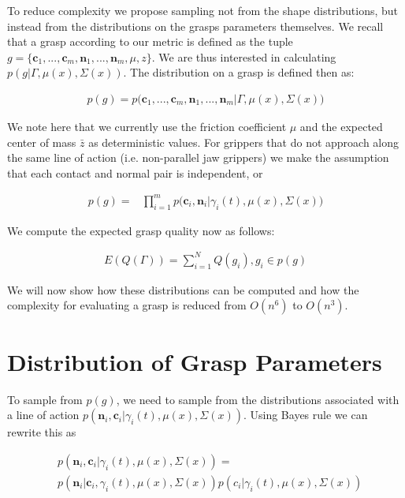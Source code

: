 \documentclass[letterpaper, 10 pt, conference]{ieeeconf}  %
\begin{document}
To reduce complexity we propose sampling not from the shape distributions, but instead from the distributions on the grasps parameters themselves. We recall that a grasp according to our metric is defined as the tuple $g = \lbrace \textbf{c}_1,...,\textbf{c}_m,\textbf{n}_1,...,\textbf{n}_m,\mu, z \rbrace$. We are thus interested in calculating $p(g|\Gamma,\mu(x),\Sigma(x))$. The distribution on a grasp is defined then as: 

\begin{align}\label{eq:joint_on_shape}
p(g) = p\big(\textbf{c}_1,...,\textbf{c}_m,\textbf{n}_1,...,\textbf{n}_m|\Gamma,\mu(x),\Sigma(x)\big)
\end{align}

We note here that we currently use the friction coefficient $\mu$ and the expected center of mass $\bar{z}$ as deterministic values. For grippers that do not approach along the same line of action (i.e. non-parallel jaw grippers) we make the assumption that each contact and normal pair is independent, or 

\vspace{-2ex}
\begin{align}\label{eq:independence}
p(g) = &\prod_{i=1}^mp\big(\textbf{c}_i,\textbf{n}_i|\gamma_i(t),\mu(x),\Sigma(x)\big)
\end{align}



We compute the expected grasp quality now as follows: 

\vspace{-2ex}
\begin{align}\label{eq:grasp_sampling}
E(Q(\Gamma)) = \sum_{i=1}^N Q(g_i) , g_i \in p(g)
\end{align}


We will now show how these distributions can be computed and how the complexity for evaluating a grasp is reduced from $O(n^6)$ to $O(n^3)$. 


\section{Distribution of Grasp Parameters}
\label{sec:distgrasp}
 
 To sample from $p(g)$, we need to sample from the distributions associated with a line of action $p(\textbf{n}_i,\textbf{c}_i|\gamma_i(t),\mu(x),\Sigma(x))$. Using Bayes rule we can rewrite this as 
 
 \vspace{-2ex}
 \begin{align*}
 &p(\textbf{n}_i,\textbf{c}_i|\gamma_i(t),\mu(x),\Sigma(x))=\\
 &p(\textbf{n}_i|\textbf{c}_i,\gamma_i(t),\mu(x),\Sigma(x))p(c_i|\gamma_i(t),\mu(x),\Sigma(x))
 \end{align*}
 
\end{document}
